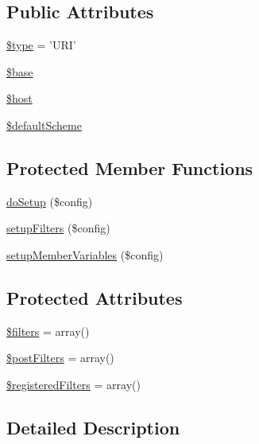 \subsection*{Public Attributes}
\begin{DoxyCompactItemize}
\item 
\hyperlink{classHTMLPurifier__URIDefinition_af8025a26e38e2dc7f9043409d5e67646}{\$type} = 'U\+R\+I'
\item 
\hyperlink{classHTMLPurifier__URIDefinition_acbd574495184a66e4d2095ec70815c59}{\$base}
\item 
\hyperlink{classHTMLPurifier__URIDefinition_abb18dbc906edbfcf04d153386a3a10c8}{\$host}
\item 
\hyperlink{classHTMLPurifier__URIDefinition_afb85743941b395f885ecde8165c19b9d}{\$default\+Scheme}
\end{DoxyCompactItemize}
\subsection*{Protected Member Functions}
\begin{DoxyCompactItemize}
\item 
\hyperlink{classHTMLPurifier__URIDefinition_aa3aeee5ee1717874f78f1bbb3d7bf32a}{do\+Setup} (\$config)
\item 
\hyperlink{classHTMLPurifier__URIDefinition_a31b5d2cb9d08b32d146a2b75d196e415}{setup\+Filters} (\$config)
\item 
\hyperlink{classHTMLPurifier__URIDefinition_af658baedeefebef90a9a0e7b6609b0e8}{setup\+Member\+Variables} (\$config)
\end{DoxyCompactItemize}
\subsection*{Protected Attributes}
\begin{DoxyCompactItemize}
\item 
\hyperlink{classHTMLPurifier__URIDefinition_aa2e2666cb45427509548175fb171c950}{\$filters} = array()
\item 
\hyperlink{classHTMLPurifier__URIDefinition_a0f4eb7bc917cbaf1af581572743389fc}{\$post\+Filters} = array()
\item 
\hyperlink{classHTMLPurifier__URIDefinition_a22a5ccf72975eba6ca2093cd5298f9f9}{\$registered\+Filters} = array()
\end{DoxyCompactItemize}


\subsection{Detailed Description}


